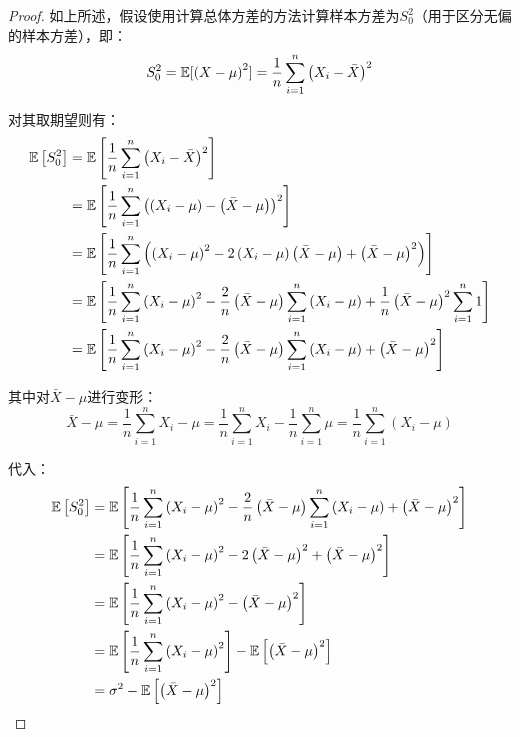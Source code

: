 \documentclass[11pt]{article}
\begin{document}
\begin{proof}
    如上所述，假设使用计算总体方差的方法计算样本方差为$S_0^2$（用于区分无偏的样本方差），即：
    \begin{equation*}
        S_0^2 = \mathbb{E}[\left(X - \mu \right)^2]
        = \frac{1}{n} \sum_{i=1}^{n} \left( X_i - \bar{X} \right)^2
    \end{equation*}

    对其取期望则有：
    \begin{align*}
        \mathbb{E}\left[S_0^2\right] 
        &= \mathbb{E} \left[\frac{1}{n} \sum_{i=1}^{n} \left( X_i - \bar{X} \right)^2 \right] \\
        &= \mathbb{E} \left[\frac{1}{n} \sum_{i=1}^{n} \left( \left( X_i - \mu \right) - \left( \bar{X} - \mu \right) \right)^2 \right] \\
        &= \mathbb{E} \left[\frac{1}{n} \sum_{i=1}^{n} \left( \left( X_i - \mu \right)^2 - 2 \left( X_i - \mu \right) \left( \bar{X} - \mu \right) + \left( \bar{X} - \mu \right)^2 \right) \right] \\
        &= \mathbb{E} \left[\frac{1}{n} \sum_{i=1}^{n} \left( X_i - \mu \right)^2 - \frac{2}{n} \left( \bar{X} - \mu \right) \sum_{i=1}^{n} \left( X_i - \mu \right) + \frac{1}{n} \left( \bar{X} - \mu \right)^2 \sum_{i=1}^{n} 1 \right] \\
        &= \mathbb{E} \left[\frac{1}{n} \sum_{i=1}^{n} \left( X_i - \mu \right)^2 - \frac{2}{n} \left( \bar{X} - \mu \right) \sum_{i=1}^{n} \left( X_i - \mu \right) + \left( \bar{X} - \mu \right)^2 \right]
    \end{align*}
    
    其中对$\bar{X} - \mu$进行变形：
    \begin{equation*}
        \bar{X} - \mu = \frac{1}{n} \sum_{i=1}^{n} X_i - \mu
        = \frac{1}{n} \sum_{i=1}^{n} X_i - \frac{1}{n} \sum_{i=1}^{n}\mu
        = \frac{1}{n} \sum_{i=1}^{n} \left( X_i - \mu \right)
    \end{equation*}

    代入：
    \begin{align*}
        \mathbb{E}\left[S_0^2\right] 
        &= \mathbb{E} \left[\frac{1}{n} \sum_{i=1}^{n} \left( X_i - \mu \right)^2 - \frac{2}{n} \left( \bar{X} - \mu \right) \sum_{i=1}^{n} \left( X_i - \mu \right) + \left( \bar{X} - \mu \right)^2 \right] \\
        &= \mathbb{E} \left[\frac{1}{n} \sum_{i=1}^{n} \left( X_i - \mu \right)^2 - 2 \left( \bar{X} - \mu \right)^2 + \left( \bar{X} - \mu \right)^2 \right] \\
        &= \mathbb{E} \left[\frac{1}{n} \sum_{i=1}^{n} \left( X_i - \mu \right)^2 - \left( \bar{X} - \mu \right)^2 \right] \\
        &= \mathbb{E} \left[\frac{1}{n} \sum_{i=1}^{n} \left( X_i - \mu \right)^2 \right] - \mathbb{E}\left[\left( \bar{X} - \mu \right)^2 \right] \\
        &= \sigma^2 - \mathbb{E}\left[\left( \bar{X} - \mu \right)^2 \right] \\
    \end{align*}


\end{proof}
\end{document}
